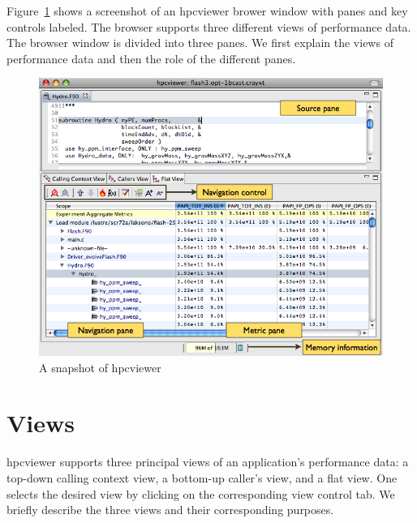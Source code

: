 \documentclass[a4paper,11pt]{article}
\begin{document}
 Figure~\ref{fig:hpcviewer} shows a screenshot of an hpcviewer brower window with  panes and key controls labeled. The browser supports three different views  of performance data. The browser window is divided into three panes. We  first explain the views of performance data and then the role of the different  panes.  

\begin{figure}
\begin{center}
\includegraphics{images/hpcviewer-legend.png}
\caption{A snapshot of hpcviewer} 
\label{fig:hpcviewer}
\end{center}
\end{figure}


\section{Views}

 hpcviewer supports three principal views of an application's performance data: a top-down calling context view, a bottom-up caller's view,  and a flat view. One selects the desired view by clicking on the corresponding  view control tab. We briefly describe the three views and their corresponding  purposes.  
\end{document}
